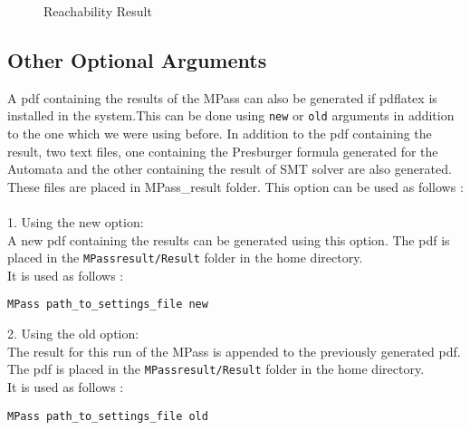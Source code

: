 \begin{figure}[H]
  \begin{center}
  \end{center}
\caption{Reachability Result}\label{fig:result}
\end{figure}
\pagebreak

\subsection{Other Optional Arguments}
\def\verbatim@font{\normalfont\ttfamily}

A pdf containing the results of the MPass can also be generated if pdflatex is 
installed in the system.This can be done using {\tt new} or {\tt old} arguments in addition to the one which we were using before. In addition to the pdf containing
the result, two text files, one containing the Presburger formula generated for the Automata and the other containing the result of SMT solver are also generated. 
These files are placed in MPass\_result folder. This option can be used as follows :\\\\
1. Using the new option:\\
A new pdf containing the results can be generated using this option. The pdf is placed
in the {\tt MPass\textunderscore result/Result} folder in the home directory.\\
It is used as follows :
\begin{Verbatim}
MPass path_to_settings_file new
\end{Verbatim}
2. Using the old option:\\
The result for this run of the MPass is appended to the previously generated pdf. 
The pdf is placed in the {\tt MPass\textunderscore result/Result} folder in the home directory.\\
It is used as follows :
\begin{Verbatim}
MPass path_to_settings_file old
\end{Verbatim}




